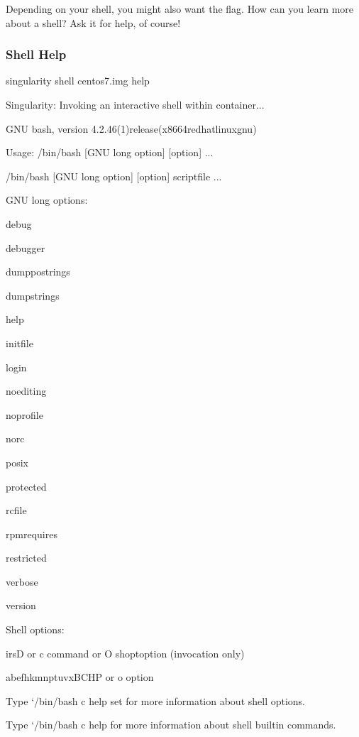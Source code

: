 \documentclass[letterpaper,10pt,english]{sphinxmanual}
\begin{document}
Depending on your shell, you might also want the  flag. How can you learn
more about a shell? Ask it for help, of course!


\subsubsection{Shell Help}
\label{\detokenize{appendix:shell-help}}
%
\begin{sphinxVerbatim}[commandchars=\\\{\}]
\PYGZdl{} singularity shell centos7.img \PYGZhy{}\PYGZhy{}help

Singularity: Invoking an interactive shell within container...


GNU bash, version 4.2.46(1)\PYGZhy{}release\PYGZhy{}(x86\PYGZus{}64\PYGZhy{}redhat\PYGZhy{}linux\PYGZhy{}gnu)

Usage:  /bin/bash [GNU long option] [option] ...

    /bin/bash [GNU long option] [option] script\PYGZhy{}file ...

GNU long options:

    \PYGZhy{}\PYGZhy{}debug

    \PYGZhy{}\PYGZhy{}debugger

    \PYGZhy{}\PYGZhy{}dump\PYGZhy{}po\PYGZhy{}strings

    \PYGZhy{}\PYGZhy{}dump\PYGZhy{}strings

    \PYGZhy{}\PYGZhy{}help

    \PYGZhy{}\PYGZhy{}init\PYGZhy{}file

    \PYGZhy{}\PYGZhy{}login

    \PYGZhy{}\PYGZhy{}noediting

    \PYGZhy{}\PYGZhy{}noprofile

    \PYGZhy{}\PYGZhy{}norc

    \PYGZhy{}\PYGZhy{}posix

    \PYGZhy{}\PYGZhy{}protected

    \PYGZhy{}\PYGZhy{}rcfile

    \PYGZhy{}\PYGZhy{}rpm\PYGZhy{}requires

    \PYGZhy{}\PYGZhy{}restricted

    \PYGZhy{}\PYGZhy{}verbose

    \PYGZhy{}\PYGZhy{}version

Shell options:

    \PYGZhy{}irsD or \PYGZhy{}c command or \PYGZhy{}O shopt\PYGZus{}option      (invocation only)

    \PYGZhy{}abefhkmnptuvxBCHP or \PYGZhy{}o option

Type {}`/bin/bash \PYGZhy{}c \PYGZdq{}help set\PYGZdq{}\PYGZsq{} for more information about shell options.

Type {}`/bin/bash \PYGZhy{}c help\PYGZsq{} for more information about shell builtin commands.
\end{sphinxVerbatim}
\end{document}
